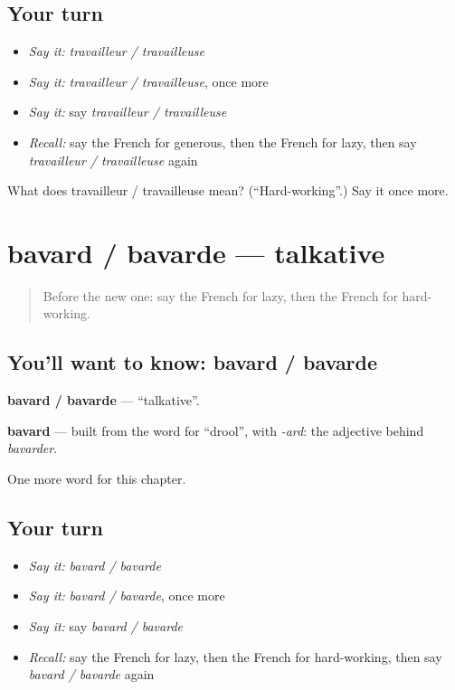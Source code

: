 \subsection*{Your turn}
\begin{itemize}
\raggedright
  \item \emph{Say it:} \emph{travailleur / travailleuse}
  \item \emph{Say it:} \emph{travailleur / travailleuse}, once more
  \item \emph{Say it:} say \emph{travailleur / travailleuse}
  \item \emph{Recall:} say the French for generous, then the French for lazy, then say \emph{travailleur / travailleuse} again
\end{itemize}

\begin{tcolorbox}[breakable,colback=teal!4,colframe=teal!35!black,title={Before you move on}]
What does travailleur / travailleuse mean? (\textquotedblleft{}Hard-working\textquotedblright{}.) Say it once more.
\end{tcolorbox}
\section[bavard / bavarde]{bavard / bavarde — talkative}

\label{lesson:FR-C246-bavard-bavarde}



\begin{quote}
Before the new one: say the French for lazy, then the French for hard-working.
\end{quote}

\subsection*{You'll want to know: bavard / bavarde}
\textbf{bavard / bavarde} — \textquotedblleft{}talkative\textquotedblright{}.

\begin{cousinweb}
\textbf{bavard} — built from the word for \textquotedblleft{}drool\textquotedblright{}, with \emph{-ard}: the adjective behind \emph{bavarder}.
\end{cousinweb}

\begin{grammarlens}[title={What you've built}]
One more word for this chapter.
\end{grammarlens}

\subsection*{Your turn}
\begin{itemize}
\raggedright
  \item \emph{Say it:} \emph{bavard / bavarde}
  \item \emph{Say it:} \emph{bavard / bavarde}, once more
  \item \emph{Say it:} say \emph{bavard / bavarde}
  \item \emph{Recall:} say the French for lazy, then the French for hard-working, then say \emph{bavard / bavarde} again
\end{itemize}

